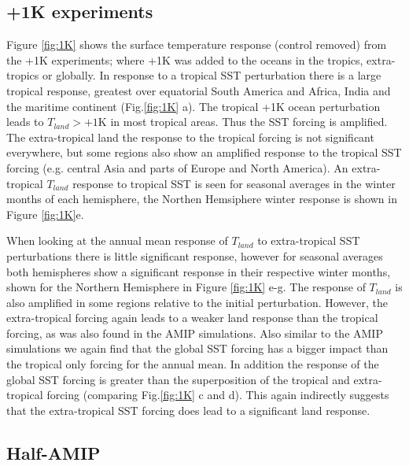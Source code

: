 \subsection{+1K experiments}

Figure \ref{fig:1K} shows the surface temperature response (control removed) 
from the +1K experiments; where +1K was added to the oceans in the tropics, 
extra-tropics or globally. In response to a tropical SST perturbation there is a 
large tropical response, greatest over equatorial South America and Africa, 
India and the maritime continent (Fig.\ref{fig:1K} a). The tropical +1K ocean 
perturbation leads to $T_{land}>+1$K in most tropical areas. Thus the SST 
forcing is amplified. The extra-tropical land the response to the tropical 
forcing is not significant everywhere, but some regions also show an amplified 
response to the tropical SST forcing (e.g. central Asia and parts of Europe and 
North America).  An extra-tropical $T_{land}$ response to tropical SST is seen 
for seasonal averages in the winter months of each hemisphere, the Northen 
Hemsiphere winter response is shown in Figure \ref{fig:1K}e.

When looking at the annual mean response of $T_{land}$ to extra-tropical SST 
perturbations there is little significant response, however for seasonal 
averages both hemispheres show a significant response in their respective winter 
months, shown for the Northern Hemisphere in Figure \ref{fig:1K} e-g. The 
response of $T_{land}$ is also amplified in some regions relative to the initial 
perturbation.  However, the extra-tropical forcing again leads to a weaker land 
response than the tropical forcing, as was also found in the AMIP simulations.  
Also similar to the AMIP simulations we again find that the  global SST forcing 
has a bigger impact than the tropical only forcing for the annual mean. In 
addition the response of the global SST forcing is greater than the 
superposition of the tropical and extra-tropical forcing (comparing 
Fig.\ref{fig:1K} c and d).  This again indirectly suggests that the 
extra-tropical SST forcing does lead to a significant land response.

\subsection{Half-AMIP}

